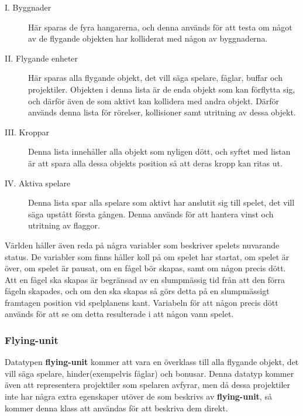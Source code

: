 \documentclass[12pt,a4paper]{article}
\newcounter{subsubsubsection}[subsubsection]
\begin{document}
\begin{description}
	\item [  I. Byggnader] Här sparas de fyra hangarerna, och denna används för att testa om något av de flygande objekten har kolliderat med någon av byggnaderna.
	
	\item [  II. Flygande enheter] Här sparas alla flygande objekt, det vill säga spelare, fåglar, buffar och projektiler. Objekten i denna lista är de enda objekt som kan förflytta sig, och därför även de som aktivt kan kollidera med andra objekt. Därför används denna lista för rörelser, kollisioner samt utritning av dessa objekt.
	
	\item [  III. Kroppar] Denna lista innehåller alla objekt som nyligen dött, och syftet med listan är att spara alla dessa objekts position så att deras kropp kan ritas ut.
	
	
	\item [  IV. Aktiva spelare] Denna lista spar alla spelare som aktivt har anslutit sig till spelet, det vill säga upstått första gången. Denna används för att hantera vinst och utritning av flaggor.
\end{description}


Världen håller även reda på några variabler som beskriver spelets nuvarande status. De variabler som finns håller koll på om spelet har startat, om spelet är över, om spelet är pausat, om en fågel bör skapas, samt om någon precis dött. Att en fågel ska skapas är begränsad av en slumpmässig tid från att den förra fågeln skapades, och om den ska skapas så görs detta på en slumpmässigt framtagen position vid spelplanens kant. Variabeln för att någon precis dött används för att se om detta resulterade i att någon vann spelet.

\subsubsection{Flying-unit}
Datatypen \textbf{flying-unit} kommer att vara en överklass till alla flygande objekt, det vill säga spelare, hinder(exempelvis fåglar) och bonusar. Denna datatyp kommer även att representera projektiler som spelaren avfyrar, men då dessa projektiler inte har några extra egenskaper utöver de som beskrivs av \textbf{flying-unit}, så kommer denna klass att användas för att beskriva dem direkt.
\vspace{0.2cm}
\end{document}
